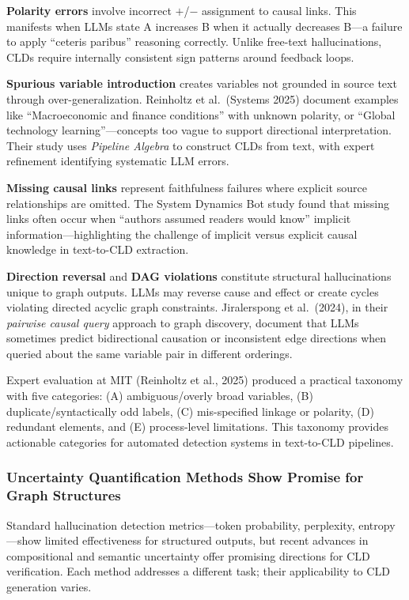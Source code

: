 \textbf{Polarity errors} involve incorrect $+$/$-$ assignment to causal links. This manifests when LLMs state A increases B when it actually decreases B---a failure to apply ``ceteris paribus'' reasoning correctly. Unlike free-text hallucinations, CLDs require internally consistent sign patterns around feedback loops.

\textbf{Spurious variable introduction} creates variables not grounded in source text through over-generalization. Reinholtz et al.\ (Systems 2025) document examples like ``Macroeconomic and finance conditions'' with unknown polarity, or ``Global technology learning''---concepts too vague to support directional interpretation. Their study uses \textit{Pipeline Algebra} to construct CLDs from text, with expert refinement identifying systematic LLM errors.

\textbf{Missing causal links} represent faithfulness failures where explicit source relationships are omitted. The System Dynamics Bot study found that missing links often occur when ``authors assumed readers would know'' implicit information---highlighting the challenge of implicit versus explicit causal knowledge in text-to-CLD extraction.

\textbf{Direction reversal} and \textbf{DAG violations} constitute structural hallucinations unique to graph outputs. LLMs may reverse cause and effect or create cycles violating directed acyclic graph constraints. Jiralerspong et al.\ (2024), in their \textit{pairwise causal query} approach to graph discovery, document that LLMs sometimes predict bidirectional causation or inconsistent edge directions when queried about the same variable pair in different orderings.

Expert evaluation at MIT (Reinholtz et al., 2025) produced a practical taxonomy with five categories: (A) ambiguous/overly broad variables, (B) duplicate/syntactically odd labels, (C) mis-specified linkage or polarity, (D) redundant elements, and (E) process-level limitations. This taxonomy provides actionable categories for automated detection systems in text-to-CLD pipelines.

\subsubsection{Uncertainty Quantification Methods Show Promise for Graph Structures}

Standard hallucination detection metrics---token probability, perplexity, entropy---show limited effectiveness for structured outputs, but recent advances in compositional and semantic uncertainty offer promising directions for CLD verification. Each method addresses a different task; their applicability to CLD generation varies.

